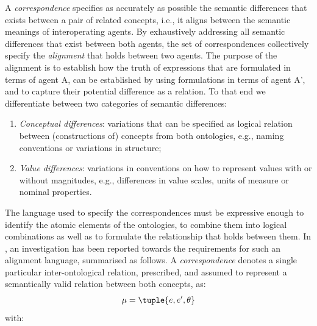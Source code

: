 \documentclass[sort&compress,preprint,authoryear,3p,twocolumn]{elsarticle}
\providecommand{\tightlist}{%
  \setlength{\itemsep}{0pt}\setlength{\parskip}{0pt}}
\begin{document}
A \emph{correspondence} specifies as accurately as possible the semantic
differences that exists between a pair of related concepts, i.e., it
aligns between the semantic meanings of interoperating agents. By
exhaustively addressing all semantic differences that exist between both
agents, the set of correspondences collectively specify the
\emph{alignment} that holds between two agents. The purpose of the
alignment is to establish how the truth of expressions that are
formulated in terms of agent A, can be established by using formulations
in terms of agent A', and to capture their potential difference as a
relation. To that end we differentiate between two categories of
semantic differences:

\begin{enumerate}
\def\labelenumi{\arabic{enumi}.}
\tightlist
\item
  \emph{Conceptual differences}: variations that can be specified as
  logical relation between (constructions of) concepts from both
  ontologies, e.g., naming conventions or variations in structure;
\item
  \emph{Value differences}: variations in conventions on how to
  represent values with or without magnitudes, e.g., differences in
  value scales, units of measure or nominal properties.
\end{enumerate}

The language used to specify the correspondences must be expressive
enough to identify the atomic elements of the ontologies, to combine
them into logical combinations as well as to formulate the relationship
that holds between them. In \citep{Euzenat2007, Scharffe2011}, an
investigation has been reported towards the requirements for such an
alignment language, summarised as follows. A \emph{correspondence}
denotes a single particular inter-ontological relation, prescribed, and
assumed to represent a semantically valid relation between both
concepts, as: \begin{equation*}\label{eq:correspondence}
\mu = \tuple{ e, e', \theta }
\end{equation*} with:
\end{document}

